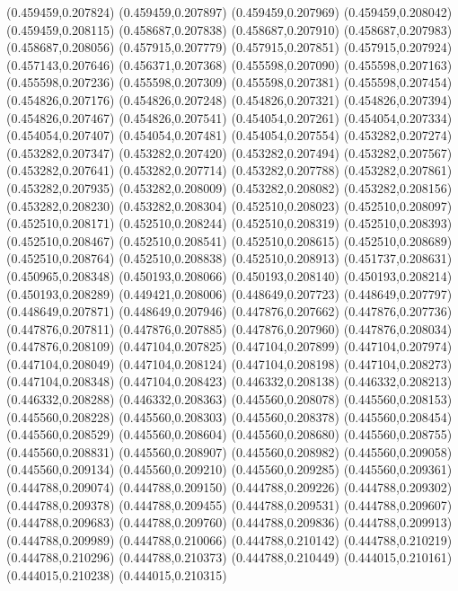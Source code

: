 (0.459459,0.207824)
(0.459459,0.207897)
(0.459459,0.207969)
(0.459459,0.208042)
(0.459459,0.208115)
(0.458687,0.207838)
(0.458687,0.207910)
(0.458687,0.207983)
(0.458687,0.208056)
(0.457915,0.207779)
(0.457915,0.207851)
(0.457915,0.207924)
(0.457143,0.207646)
(0.456371,0.207368)
(0.455598,0.207090)
(0.455598,0.207163)
(0.455598,0.207236)
(0.455598,0.207309)
(0.455598,0.207381)
(0.455598,0.207454)
(0.454826,0.207176)
(0.454826,0.207248)
(0.454826,0.207321)
(0.454826,0.207394)
(0.454826,0.207467)
(0.454826,0.207541)
(0.454054,0.207261)
(0.454054,0.207334)
(0.454054,0.207407)
(0.454054,0.207481)
(0.454054,0.207554)
(0.453282,0.207274)
(0.453282,0.207347)
(0.453282,0.207420)
(0.453282,0.207494)
(0.453282,0.207567)
(0.453282,0.207641)
(0.453282,0.207714)
(0.453282,0.207788)
(0.453282,0.207861)
(0.453282,0.207935)
(0.453282,0.208009)
(0.453282,0.208082)
(0.453282,0.208156)
(0.453282,0.208230)
(0.453282,0.208304)
(0.452510,0.208023)
(0.452510,0.208097)
(0.452510,0.208171)
(0.452510,0.208244)
(0.452510,0.208319)
(0.452510,0.208393)
(0.452510,0.208467)
(0.452510,0.208541)
(0.452510,0.208615)
(0.452510,0.208689)
(0.452510,0.208764)
(0.452510,0.208838)
(0.452510,0.208913)
(0.451737,0.208631)
(0.450965,0.208348)
(0.450193,0.208066)
(0.450193,0.208140)
(0.450193,0.208214)
(0.450193,0.208289)
(0.449421,0.208006)
(0.448649,0.207723)
(0.448649,0.207797)
(0.448649,0.207871)
(0.448649,0.207946)
(0.447876,0.207662)
(0.447876,0.207736)
(0.447876,0.207811)
(0.447876,0.207885)
(0.447876,0.207960)
(0.447876,0.208034)
(0.447876,0.208109)
(0.447104,0.207825)
(0.447104,0.207899)
(0.447104,0.207974)
(0.447104,0.208049)
(0.447104,0.208124)
(0.447104,0.208198)
(0.447104,0.208273)
(0.447104,0.208348)
(0.447104,0.208423)
(0.446332,0.208138)
(0.446332,0.208213)
(0.446332,0.208288)
(0.446332,0.208363)
(0.445560,0.208078)
(0.445560,0.208153)
(0.445560,0.208228)
(0.445560,0.208303)
(0.445560,0.208378)
(0.445560,0.208454)
(0.445560,0.208529)
(0.445560,0.208604)
(0.445560,0.208680)
(0.445560,0.208755)
(0.445560,0.208831)
(0.445560,0.208907)
(0.445560,0.208982)
(0.445560,0.209058)
(0.445560,0.209134)
(0.445560,0.209210)
(0.445560,0.209285)
(0.445560,0.209361)
(0.444788,0.209074)
(0.444788,0.209150)
(0.444788,0.209226)
(0.444788,0.209302)
(0.444788,0.209378)
(0.444788,0.209455)
(0.444788,0.209531)
(0.444788,0.209607)
(0.444788,0.209683)
(0.444788,0.209760)
(0.444788,0.209836)
(0.444788,0.209913)
(0.444788,0.209989)
(0.444788,0.210066)
(0.444788,0.210142)
(0.444788,0.210219)
(0.444788,0.210296)
(0.444788,0.210373)
(0.444788,0.210449)
(0.444015,0.210161)
(0.444015,0.210238)
(0.444015,0.210315)
